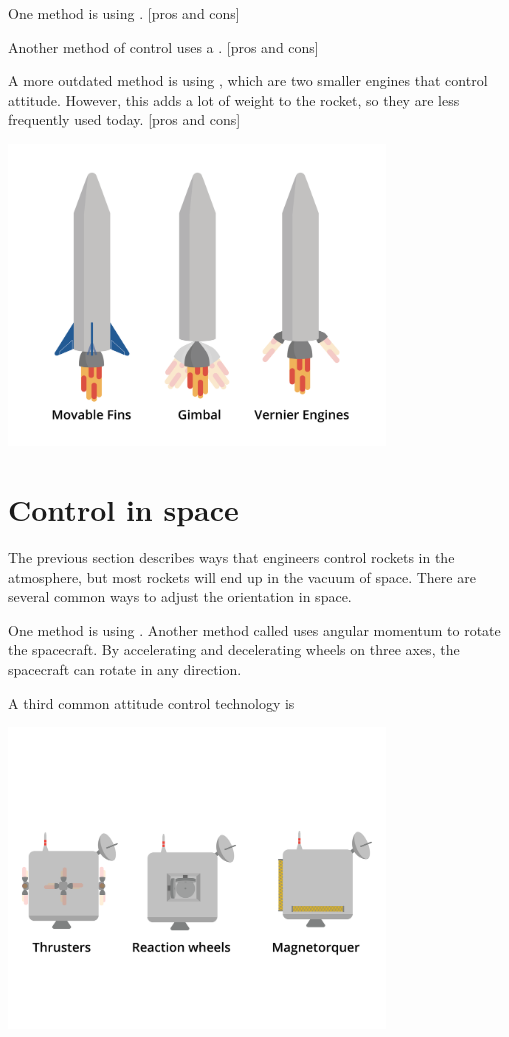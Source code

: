 	
	One method is using .  [pros and cons]

	Another method of control uses a . [pros and cons]
	
	A more outdated method is using , which are two smaller engines that control attitude. However, this adds a lot of weight to the rocket, so they are less frequently used today. [pros and cons]

	\includegraphics[width=0.75\textwidth]{control.png}


\section{Control in space}

The previous section describes ways that engineers control rockets in the atmosphere, but most rockets will end up in the vacuum of space. There are several common ways to adjust the orientation in space.

	One method is using . 
	Another method called  uses angular momentum to rotate the spacecraft. By accelerating and decelerating wheels on three axes, the spacecraft can rotate in any direction.

	A third common attitude control technology is 


	\includegraphics[width=0.75\textwidth]{controlSpace.png}





